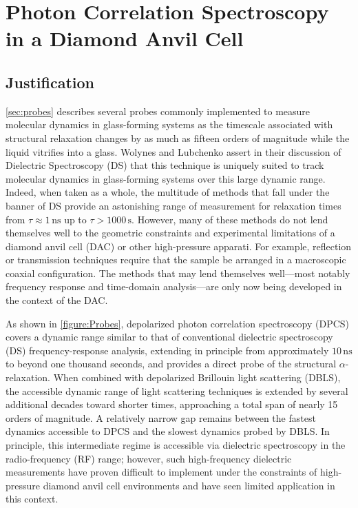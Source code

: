 \graphicspath{{Chapters/PCS/Figures/}}

\chapter{Photon Correlation Spectroscopy in a Diamond Anvil Cell} \label{chap:PCS}
\section{Justification}\label{sec:PCSIntro}

\sect \ref{sec:probes} describes several probes commonly implemented to measure molecular dynamics in glass-forming systems as the timescale associated with structural relaxation changes by as much as fifteen orders of magnitude while the liquid vitrifies into a glass. Wolynes and Lubchenko assert in their discussion of Dielectric Spectroscopy (DS) that this technique is uniquely suited to track molecular dynamics in glass-forming systems over this large dynamic range. Indeed, when taken as a whole, the multitude of methods that fall under the banner of DS provide an astonishing range of measurement for relaxation times from $\tau \approx 1 \,\si{\nano\second}$ up to $\tau > 1000 \,\si{\second}$\nolinebreak\cite{Wolynes}. However, many of these methods do not lend themselves well to the geometric constraints and experimental limitations of a diamond anvil cell (DAC) or other high-pressure apparati. For example, reflection or transmission techniques require that the sample be arranged in a macroscopic coaxial configuration. The methods that may lend themselves well—most notably frequency response and time-domain analysis—are only now being developed in the context of the DAC\cite{Peng,Chan,Ransom2017DACDielectric}.

As shown in \fig \ref{figure:Probes}, depolarized photon correlation spectroscopy (DPCS) covers a dynamic range similar to that of conventional dielectric spectroscopy (DS) frequency-response analysis, extending in principle from approximately $10 \,\si{\nano\second}$ to beyond one thousand seconds, and provides a direct probe of the structural $\alpha$-relaxation. When combined with depolarized Brillouin light scattering (DBLS), the accessible dynamic range of light scattering techniques is extended by several additional decades toward shorter times, approaching a total span of nearly 15 orders of magnitude. A relatively narrow gap remains between the fastest dynamics accessible to DPCS and the slowest dynamics probed by DBLS. In principle, this intermediate regime is accessible via dielectric spectroscopy in the radio-frequency (RF) range; however, such high-frequency dielectric measurements have proven difficult to implement under the constraints of high-pressure diamond anvil cell environments and have seen limited application in this context.  

